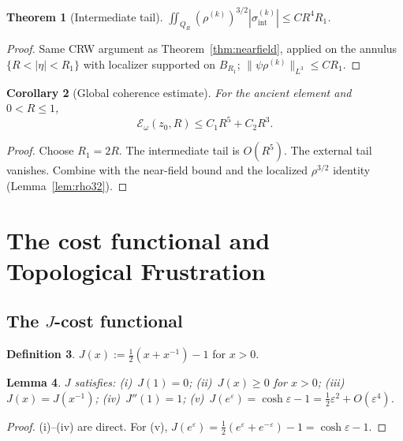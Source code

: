 \documentclass[12pt, reqno]{amsart}
\newtheorem{theorem}{Theorem}[section]
\newtheorem{lemma}[theorem]{Lemma}
\newtheorem{corollary}[theorem]{Corollary}
\theoremstyle{definition}
\newtheorem{definition}[theorem]{Definition}
\theoremstyle{remark}
\numberwithin{equation}{section}
\newcommand{\eps}{\varepsilon}
\newcommand{\Ecal}{\mathcal{E}}
\newcommand{\Jc}{J}
\begin{document}
\begin{theorem}[Intermediate tail]\label{thm:int-tail}
$\iint_{Q_R}(\rho^{(k)})^{3/2}|\sigma_{\mathrm{int}}^{(k)}|\le CR^4 R_1$.
\end{theorem}
\begin{proof}
Same CRW argument as Theorem~\ref{thm:nearfield}, applied on the
annulus $\{R<|\eta|<R_1\}$ with localizer supported on $B_{R_1}$;
$\|\psi\rho^{(k)}\|_{L^3}\le CR_1$.
\end{proof}

\begin{corollary}[Global coherence estimate]\label{cor:coherence}
For the ancient element and $0<R\le 1$,
\begin{equation}\label{eq:coherence}
\Ecal_\omega(z_0,R)\le C_1 R^5 + C_2 R^3.
\end{equation}
\end{corollary}
\begin{proof}
Choose $R_1=2R$.  The intermediate tail is $O(R^5)$.  The external
tail vanishes.  Combine with the near-field bound and the localized
$\rho^{3/2}$ identity (Lemma~\ref{lem:rho32}).
\end{proof}

\section{The cost functional and Topological Frustration}%
\label{sec:frustration}

\subsection{The $\Jc$-cost functional}

\begin{definition}\label{def:Jcost}
$\Jc(x):=\tfrac12(x+x^{-1})-1$ for $x>0$.
\end{definition}

\begin{lemma}\label{lem:Jprops}
$\Jc$ satisfies:
(i)~$\Jc(1)=0$;\quad
(ii)~$\Jc(x)\ge 0$ for $x>0$;\quad
(iii)~$\Jc(x)=\Jc(x^{-1})$;\quad
(iv)~$\Jc''(1)=1$;\quad
(v)~$\Jc(e^\eps)=\cosh\eps-1=\tfrac12\eps^2+O(\eps^4)$.
\end{lemma}
\begin{proof}
(i)--(iv) are direct.  For (v), $\Jc(e^\eps)=\tfrac12(e^\eps+e^{-\eps})-1=\cosh\eps-1$.
\end{proof}
\end{document}
